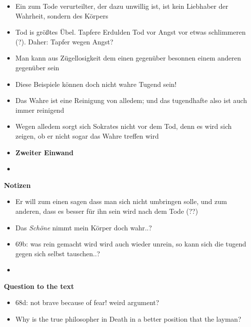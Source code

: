 \documentclass[emulatestandardclasses]{scrartcl}
\begin{document}
\begin{itemize}
  \item Ein zum Tode verurteilter, der dazu unwillig ist, ist kein Liebhaber der Wahrheit, sondern des Körpers
  \item Tod is größtes Übel. Tapfere Erdulden Tod vor Angst vor etwas schlimmeren (?). Daher: Tapfer wegen Angst?  
  \item Man kann aus Zügellosigkeit dem einen gegenüber besonnen einem anderen gegenüber sein
  \item Diese Beispiele können doch nicht wahre Tugend sein!
  \item Das Wahre ist eine Reinigung von alledem; und das tugendhafte also ist auch immer reinigend
  \item Wegen alledem sorgt sich Sokrates nicht vor dem Tod, denn es wird sich zeigen, ob er nicht sogar das Wahre treffen wird 
  \item \textbf{Zweiter Einwand}
  \item 
\end{itemize}

\textbf{Notizen}

\begin{itemize}
  \item Er will zum einen sagen dass man sich nicht umbringen solle, und zum anderen, dass es besser für ihn sein wird nach dem Tode (??)
  \item Das \emph{Schöne} nimmt mein Körper doch wahr..?
  \item 69b: was rein gemacht wird wird auch wieder unrein, so kann sich die tugend gegen sich selbst tauschen..?
  \item 
\end{itemize}

\textbf{Question to the text}

\begin{itemize}
  \item 68d: not brave because of fear! weird argument?
  \item Why is the true philosopher in Death in a better position that the layman?
\end{itemize}


\newpage
%


\end{document}
